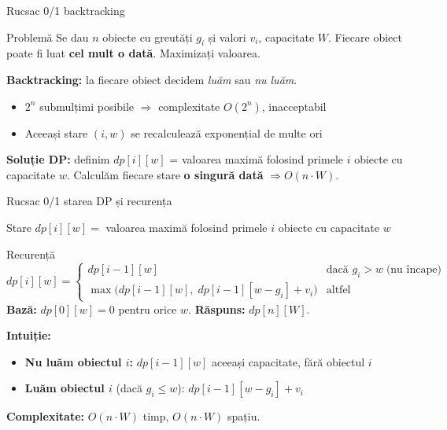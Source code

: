 \documentclass[10pt]{beamer}
\begin{document}
\begin{frame}{Rucsac 0/1 \textemdash{} backtracking}
  \begin{block}{Problemă}
    Se dau $n$ obiecte cu greutăți $g_i$ și valori $v_i$, capacitate $W$.
    Fiecare obiect poate fi luat \textbf{cel mult o dată}. Maximizați valoarea.
  \end{block}
  \smallskip
  \textbf{Backtracking:} la fiecare obiect decidem \textit{luăm} sau \textit{nu luăm}.
  \begin{itemize}\itemsep2pt
    \item $2^n$ submulțimi posibile $\Rightarrow$ complexitate $O(2^n)$, inacceptabil
    \item Aceeași stare $(i, w)$ se recalculează exponențial de multe ori
  \end{itemize}
  \smallskip
  \textbf{Soluție DP:} definim $dp[i][w]$ = valoarea maximă folosind primele $i$ obiecte
  cu capacitate $w$. Calculăm fiecare stare \textbf{o singură dată} $\Rightarrow O(n \cdot W)$.
\end{frame}

\begin{frame}{Rucsac 0/1 \textemdash{} starea DP și recurența}
  \begin{block}{Stare}
    $dp[i][w] = $ valoarea maximă folosind primele $i$ obiecte cu capacitate $w$
  \end{block}
  \begin{block}{Recurență}
    \[
      dp[i][w] = \begin{cases}
        dp[i-1][w] & \text{dacă } g_i > w\;\text{(nu încape)} \\
        \max\!\bigl(dp[i-1][w],\; dp[i-1][w-g_i]+v_i\bigr) & \text{altfel}
      \end{cases}
    \]
    \textbf{Bază:} $dp[0][w] = 0$ pentru orice $w$. \quad \textbf{Răspuns:} $dp[n][W]$.
  \end{block}
  \smallskip
  \textbf{Intuiție:}
  \begin{itemize}\itemsep1pt
    \item \textbf{Nu luăm obiectul $i$:} $dp[i-1][w]$ \textemdash{} aceeași capacitate, fără obiectul $i$
    \item \textbf{Luăm obiectul $i$} (dacă $g_i \le w$): $dp[i-1][w-g_i] + v_i$
  \end{itemize}
  \textbf{Complexitate:} $O(n \cdot W)$ timp, $O(n \cdot W)$ spațiu.
\end{frame}
\end{document}
